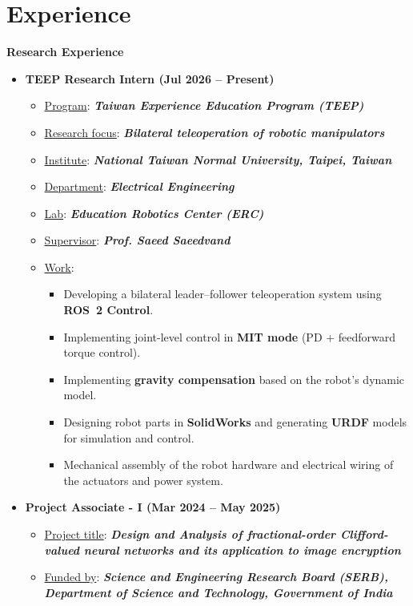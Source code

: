 \documentclass[A4,11pt]{article}
\begin{document}
\section{\textbf{\huge Experience}}
\textbf{Research Experience}
\begin{itemize}
	\item \textbf{TEEP Research Intern (Jul 2026 -- Present)}
	\begin{itemize}
		\item[] \underline{Program}: \textit{\textbf{Taiwan Experience Education Program (TEEP)}}
		\item[] \underline{Research focus}: \textit{\textbf{Bilateral teleoperation of robotic manipulators}}
		\item[] \underline{Institute}: \textit{\textbf{National Taiwan Normal University, Taipei, Taiwan}}
		\item[] \underline{Department}: \textit{\textbf{Electrical Engineering}}
		\item[] \underline{Lab}: \textit{\textbf{Education Robotics Center (ERC)}}
		\item[] \underline{Supervisor}: \textit{\textbf{Prof. Saeed Saeedvand}}
		\item[] \underline{Work}:
		\begin{itemize}
			\item Developing a bilateral leader--follower teleoperation system using \textbf{ROS~2 Control}.
			\item Implementing joint-level control in \textbf{MIT mode} (PD + feedforward torque control).
			\item Implementing \textbf{gravity compensation} based on the robot's dynamic model.
			\item Designing robot parts in \textbf{SolidWorks} and generating \textbf{URDF} models for simulation and control.
			\item Mechanical assembly of the robot hardware and electrical wiring of the actuators and power system.
		\end{itemize}
	\end{itemize}
	\item \textbf{Project Associate - I (Mar 2024 -- May 2025)}
	\begin{itemize}
		\item[] \underline{Project title}: \textit{\textbf{Design and Analysis of fractional-order Clifford-valued neural networks and its application to image encryption}}
		\item[] \underline{Funded by}: \textit{\textbf{Science and Engineering Research Board (SERB), Department of Science and Technology, Government of India}}

\end{itemize}
\end{itemize}
\end{document}
